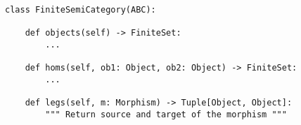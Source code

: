 \begin{verbatim}
class FiniteSemiCategory(ABC):

    def objects(self) -> FiniteSet:
        ...

    def homs(self, ob1: Object, ob2: Object) -> FiniteSet:
        ...

    def legs(self, m: Morphism) -> Tuple[Object, Object]:
        """ Return source and target of the morphism """
\end{verbatim}